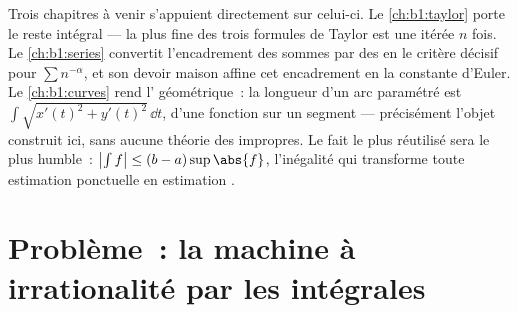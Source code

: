 \begin{remark}
Trois chapitres à venir s'appuient directement sur celui-ci. Le
\cref{ch:b1:taylor} porte le reste intégral --- la plus fine des
trois formules de Taylor est une  itérée $n$
fois. Le \cref{ch:b1:series} convertit l'encadrement des sommes par
des  en le critère décisif pour $\sum n^{-\alpha}$, et son
devoir maison affine cet encadrement en la constante d'Euler. Le
\cref{ch:b1:curves} rend l' géométrique~: la longueur d'un
arc paramétré est $\int \sqrt{x'(t)^2 + y'(t)^2}\,\dd t$, 
d'une fonction  sur un segment --- précisément l'objet
construit ici, sans aucune théorie des  impropres. Le fait
le plus réutilisé sera le plus humble~: $\bigl|\int f\bigr| \leq (b
- a)\sup\abs{f}$, l'inégalité qui transforme toute estimation
ponctuelle en estimation .
\end{remark}

\section{Problème~: la machine à irrationalité par les intégrales}

